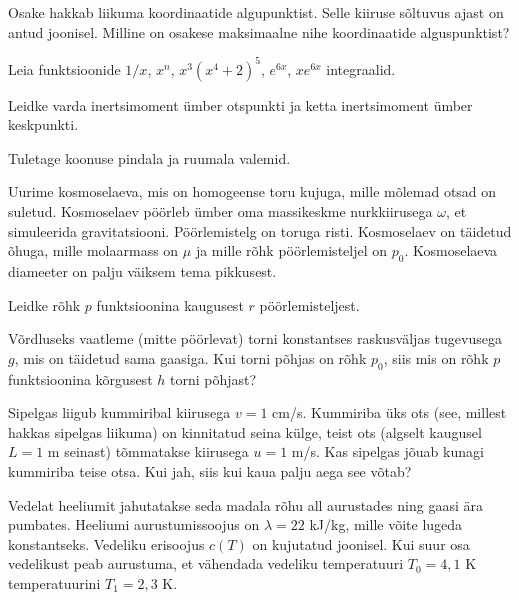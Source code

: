 \documentclass[a4paper,11pt,twocolumn]{article}
\begin{document}
\begin{question}[NBPhO 2016, P7][mat3][8cm]
	Osake hakkab liikuma koordinaatide algupunktist. Selle kiiruse sõltuvus ajast on antud joonisel. Milline on osakese maksimaalne nihe koordinaatide alguspunktist?
\end{question}
\begin{question}
	Leia funktsioonide \( 1/x \), \( x^n \), \( x^3(x^4+2)^5 \), \( e^{6x} \), \( xe^{6x} \) integraalid.
\end{question}
\begin{question}
	Leidke varda inertsimoment ümber otspunkti ja ketta inertsimoment ümber keskpunkti.
\end{question}
\begin{question}
	Tuletage koonuse pindala ja ruumala valemid.
\end{question}
\begin{question}[NBPhO 2017, P9]
	Uurime kosmoselaeva, mis on homogeense toru kujuga, mille mõlemad otsad on suletud. Kosmoselaev pöörleb ümber oma massikeskme nurkkiirusega \( \omega \), et simuleerida gravitatsiooni. Pöörlemistelg on toruga risti. Kosmoselaev on täidetud õhuga, mille molaarmass on \( \mu \) ja mille rõhk pöörlemisteljel on \( p_0 \). Kosmoselaeva diameeter on palju väiksem tema pikkusest.
	\begin{subquestion}
		\item Leidke rõhk \( p \) funktsioonina kaugusest \( r \) pöörlemisteljest.
		\item Võrdluseks vaatleme (mitte pöörlevat) torni konstantses raskusväljas tugevusega \( g \), mis on täidetud sama gaasiga. Kui torni põhjas on rõhk \( p_0 \), siis mis on rõhk \( p \) funktsioonina kõrgusest \( h \) torni põhjast?
	\end{subquestion}
\end{question}
\begin{question}
	Sipelgas liigub kummiribal kiirusega \( v=1 \) cm/s. Kummiriba üks ots (see, millest hakkas sipelgas liikuma) on kinnitatud seina külge, teist ots (algselt kaugusel \( L=1 \) m seinast) tõmmatakse kiirusega \( u=1 \) m/s. Kas sipelgas jõuab kunagi kummiriba teise otsa. Kui jah, siis kui kaua palju aega see võtab?
\end{question}
\begin{question}[NBPhO 2016, P7][mat2][\columnwidth]
	Vedelat heeliumit jahutatakse seda madala rõhu all aurustades ning gaasi ära pumbates. Heeliumi aurustumissoojus on \( λ = 22 \) kJ/kg, mille võite lugeda konstantseks. Vedeliku erisoojus \( c(T) \) on kujutatud joonisel. Kui suur osa vedelikust peab aurustuma, et vähendada vedeliku temperatuuri \( T_0 = 4,1 \) K temperatuurini \( T_1 = 2,3 \) K.
\end{question}
\end{document}

